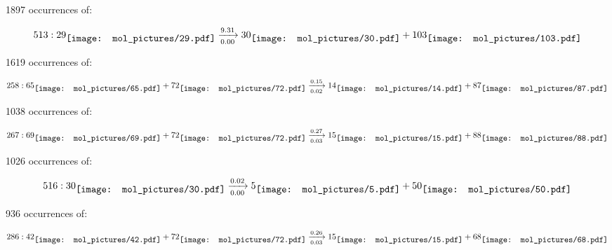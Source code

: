 \documentclass{article}
\begin{document}
\vspace{1cm}


1897 occurrences of:

$$
513:  
29
\raisebox{-.5\height}{\texttt{[image: mol\_pictures/29.pdf]}}
\xrightarrow[0.00]{9.31}
30
\raisebox{-.5\height}{\texttt{[image: mol\_pictures/30.pdf]}}
+
103
\raisebox{-.5\height}{\texttt{[image: mol\_pictures/103.pdf]}}
$$



\vspace{1cm}


1619 occurrences of:

$$
258:  
65
\raisebox{-.5\height}{\texttt{[image: mol\_pictures/65.pdf]}}
+
72
\raisebox{-.5\height}{\texttt{[image: mol\_pictures/72.pdf]}}
\xrightarrow[0.02]{0.15}
14
\raisebox{-.5\height}{\texttt{[image: mol\_pictures/14.pdf]}}
+
87
\raisebox{-.5\height}{\texttt{[image: mol\_pictures/87.pdf]}}
$$



\vspace{1cm}


1038 occurrences of:

$$
267:  
69
\raisebox{-.5\height}{\texttt{[image: mol\_pictures/69.pdf]}}
+
72
\raisebox{-.5\height}{\texttt{[image: mol\_pictures/72.pdf]}}
\xrightarrow[0.03]{0.27}
15
\raisebox{-.5\height}{\texttt{[image: mol\_pictures/15.pdf]}}
+
88
\raisebox{-.5\height}{\texttt{[image: mol\_pictures/88.pdf]}}
$$



\vspace{1cm}


1026 occurrences of:

$$
516:  
30
\raisebox{-.5\height}{\texttt{[image: mol\_pictures/30.pdf]}}
\xrightarrow[0.00]{0.02}
5
\raisebox{-.5\height}{\texttt{[image: mol\_pictures/5.pdf]}}
+
50
\raisebox{-.5\height}{\texttt{[image: mol\_pictures/50.pdf]}}
$$



\vspace{1cm}


936 occurrences of:

$$
286:  
42
\raisebox{-.5\height}{\texttt{[image: mol\_pictures/42.pdf]}}
+
72
\raisebox{-.5\height}{\texttt{[image: mol\_pictures/72.pdf]}}
\xrightarrow[0.03]{0.26}
15
\raisebox{-.5\height}{\texttt{[image: mol\_pictures/15.pdf]}}
+
68
\raisebox{-.5\height}{\texttt{[image: mol\_pictures/68.pdf]}}
$$
\end{document}
